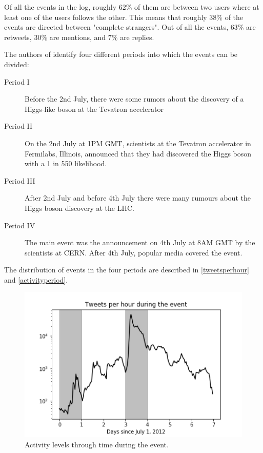 \documentclass[sigconf]{acmart}
\begin{document}
Of all the events in the log, roughly 62\% of them are between two users where at least one of the users follows the other. This means that roughly 38\% of the events are directed between "complete strangers". Out of all the events, 63\% are retweets, 30\% are mentions, and 7\% are replies. 

The authors of \cite{de2013anatomy} identify four different periods into which the events can be divided:

\begin{description}
\item[Period I] Before the 2nd July, there were some rumors about the discovery of a Higgs-like boson at the Tevatron accelerator
\item[Period II] On the 2nd July at 1PM GMT, scientists at the Tevatron accelerator in Fermilabs, Illinois, announced that they had discovered the Higgs boson with a 1 in 550 likelihood. 
\item[Period III] After 2nd July and before 4th July there were many rumours about the Higgs boson discovery at the LHC. 
\item[Period IV] The main event was the announcement on 4th July at 8AM GMT by the scientists at CERN. After 4th July, popular media covered the event. 
\end{description}

The distribution of events in the four periods are described in \autoref{tweetsperhour} and \autoref{activityperiod}. 

\begin{figure}[htbp]
\begin{center}
\includegraphics[width=\linewidth]{Figures/tweetsperhour.png}
\caption{Activity levels through time during the event.}
\label{tweetsperhour}
\end{center}
\end{figure}
\end{document}
